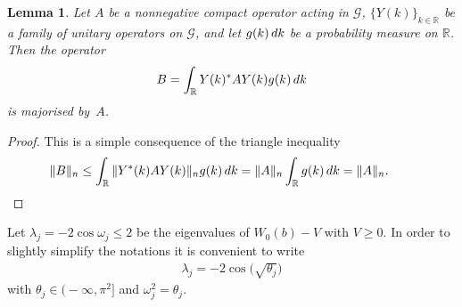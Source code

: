 \documentclass[11pt]{article}
\numberwithin{equation}{section}
\numberwithin{equation}{section}
\newtheorem{Lemma}[Theorem]{Lemma}
\begin{document}
\begin{Lemma}\label{lem:maj}
Let $A$ be a nonnegative compact operator acting in $\mathcal{G}$, $\{Y(k)\}_{k\in \mathbb R}$ be a family of unitary operators on $\mathcal{G}$, and let $g(k)\, {\rm d} k$ be a probability measure on $\mathbb R$. Then the operator
\begin{gather*}
B = \int_{\mathbb R} Y(k)^* A Y(k) g(k) \, {\rm d} k
\end{gather*}
is majorised by~$A$.
\end{Lemma}

\begin{proof}This is a simple consequence of the triangle inequality
\begin{gather*}
\|B\|_n \le \int_{\mathbb R} \| Y^*(k) A Y(k)\|_n g(k) \, {\rm d} k = \|A\|_n \int_{\mathbb R} g(k) \, {\rm d} k = \|A\|_n.\tag*{\qed}
\end{gather*}
 \renewcommand{\qed}{}
\end{proof}

Let $\lambda_j=-2\cos\omega_j\le 2$ be the eigenvalues of $W_0(b)-V$ with $V\ge0$. In order to slightly simplify the notations it is convenient to write
\begin{gather*}
\lambda_j=-2\cos\big(\sqrt{\theta_j}\big)
\end{gather*}
with $\theta_j\in\big({-}\infty,\pi^2\big]$ and $\omega_j^2=\theta_j$.
\end{document}
